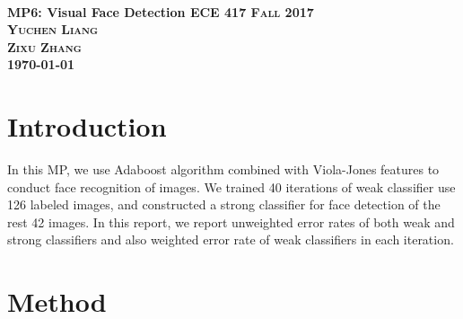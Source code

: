\documentclass{article}
\begin{document}
	
	\everymath{\displaystyle}
	\begin{titlepage}	 	
		\center
		\text{}\\[3cm]
		\linespread{2}\huge \bfseries MP6: Visual Face Detection
		\center\textsc{\Large ECE 417 Fall 2017}\\[1cm]
		\Large\center\textsc{Yuchen Liang\\ Zixu Zhang  }\\[1.4cm]
		\Large \today\\
		\vfill
	\end{titlepage}
	\setlength{\baselineskip}{24pt}
	\onehalfspacing
	\section{Introduction}
	In this MP, we use Adaboost algorithm combined with Viola-Jones features to conduct face recognition of  images. We trained 40 iterations of weak classifier use 126 labeled images, and constructed a strong classifier for face detection of the rest 42 images. In this report, we report unweighted error rates of both weak and strong classifiers and also weighted error rate of weak classifiers in each iteration. 
	
	\section{Method}
\end{document}
